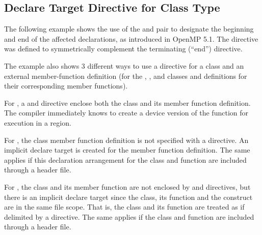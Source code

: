 
\subsection{Declare Target Directive for Class Type}
\label{subsec:declare_target_class}


The following example shows the use of the 
and  pair to designate the beginning and
end of the affected declarations, as introduced in OpenMP 5.1.
The  directive was defined
to symmetrically complement the terminating (``end'') directive.

\cppspecificstart

The example also shows 3 different ways to use a  directive for a 
class and an external member-function definition (for the , , 
and  classes and definitions for their corresponding  member functions).

For , a  and 
 directive
enclose both the class and its member function definition. The compiler immediately
knows to create a device version of the function for execution in a  region.

For , the class member function definition is not specified with a
 directive.
An implicit declare target is created for the member function definition.
The same applies if this declaration arrangement for the class and function 
are included through a header file.

For , the class and its member function are not enclosed by 
and  directives,
but there is an implicit declare target since the class, its function
and the  construct are in the same file scope. That is, the class
and its function are treated as if delimited by a  directive.
The same applies if the class and function are included through a header file.



